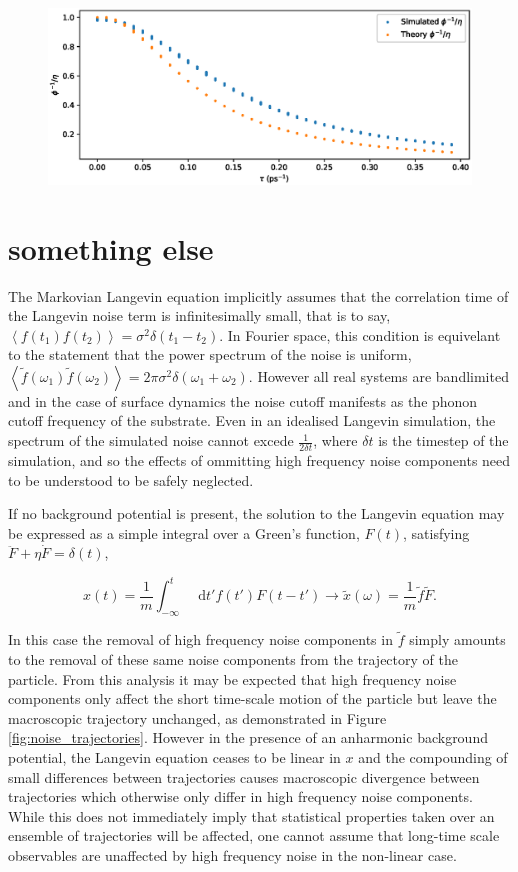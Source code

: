 \documentclass{article}
\newcommand*{\diff}{\mathop{}\!\mathrm{d}}
\begin{document}
\begin{figure}
	\centering
	\includegraphics[width=1.0\textwidth]{theoretical_tau_ttf}
	\caption{}
	\label{fig:theoretical_tau_ttf}
\end{figure}

\section{something else}

The Markovian Langevin equation implicitly assumes that the correlation time of the Langevin noise term is infinitesimally small, that is to say, $\left< f(t_1) f(t_2) \right> = \sigma^2 \delta (t_1 - t_2)$. In Fourier space, this condition is equivelant to the statement that the power spectrum of the noise is uniform, $\left< \tilde{f}(\omega_1) \tilde{f}(\omega_2) \right> = 2 \pi \sigma^2 \delta(\omega_1 + \omega_2)$. However all real systems are bandlimited and in the case of surface dynamics the noise cutoff manifests as the phonon cutoff frequency of the substrate. Even in an idealised Langevin simulation, the spectrum of the simulated noise cannot excede $\frac{1}{2\delta{t}}$, where $\delta{t}$ is the timestep of the simulation, and so the effects of ommitting high frequency noise components need to be understood to be safely neglected. 

If no background potential is present, the solution to the Langevin equation may be expressed as a simple integral over a Green's function, $F(t)$, satisfying $\ddot{F} + \eta \dot{F} = \delta(t)$,

$$
x(t) = \frac{1}{m} \int_{-\infty}^t \diff{t'} f(t') F(t-t') \longrightarrow \tilde{x}(\omega) = \frac{1}{m} \tilde{f} \tilde{F}.
$$ 

In this case the removal of high frequency noise components in $\tilde{f}$ simply amounts to the removal of these same noise components from the trajectory of the particle. From this analysis it may be expected that high frequency noise components only affect the short time-scale motion of the particle but leave the macroscopic trajectory unchanged, as demonstrated in Figure \ref{fig:noise_trajectories}. However in the presence of an anharmonic background potential, the Langevin equation ceases to be linear in $x$ and the compounding of small differences between trajectories causes macroscopic divergence between trajectories which otherwise only differ in high frequency noise components. While this does not immediately imply that statistical properties taken over an ensemble of trajectories will be affected, one cannot assume that long-time scale observables are unaffected by high frequency noise in the non-linear case.
\end{document}
